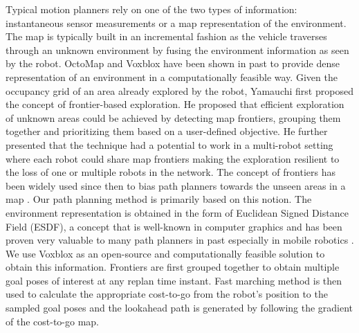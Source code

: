 \documentclass[letterpaper, 10 pt, conference]{ieeeconf}  %
\begin{document}
Typical motion planners rely on one of the two types of information: instantaneous sensor measurements or a map representation of the environment. The map is typically built in an incremental fashion as the vehicle traverses through an unknown environment by fusing the environment information as seen by the robot. OctoMap \cite{hornung13octomap} and Voxblox \cite{oleynikova2017voxblox} have been shown in past to provide dense representation of an environment in a computationally feasible way. Given the occupancy grid of an area already explored by the robot, Yamauchi \cite{yamauchi1997frontier,yamauchi1998mobile} first proposed the concept of frontier-based exploration. He proposed that efficient exploration of unknown areas could be achieved by detecting map frontiers, grouping them together and prioritizing them based on a user-defined objective. He further presented \cite{yamauchi1998frontier} that the technique had a potential to work in a multi-robot setting where each robot could share map frontiers making the exploration resilient to the loss of one or multiple robots in the network. The concept of frontiers has been widely used since then to bias path planners towards the unseen areas in a map \cite{freda2005frontier,gonzalez2002navigation, heng2015efficient}. Our path planning method is primarily based on this notion. The environment representation is obtained in the form of Euclidean Signed Distance Field (ESDF), a concept that is well-known in computer graphics and has been proven very valuable to many path planners in past especially in mobile robotics \cite{dharmadhikari2020motion,russell2020learning}. We use Voxblox as an open-source and computationally feasible solution to obtain this information. Frontiers are first grouped together to obtain multiple goal poses of interest at any replan time instant. Fast marching method is then used to calculate the appropriate cost-to-go from the robot's position to the sampled goal poses and the lookahead path is generated by following the gradient of the cost-to-go map.   \par
\end{document}
